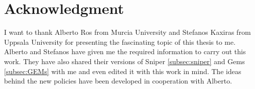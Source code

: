\chapter*{Acknowledgment}
I want to thank Alberto Ros from Murcia University and Stefanos Kaxiras from
Uppsala University for presenting the fascinating topic of this thesis to me. Alberto
and Stefanos have given me the required information to carry out this work. They have also shared their versions of Sniper \ref{subsec:sniper} and Gems \ref{subsec:GEMs} with me and even edited it with this work in mind. The ideas behind the new policies have been developed in cooperation with Alberto.
\newpage